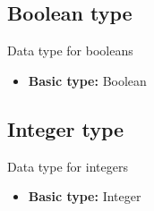\documentclass{article}
\begin{document}
\subsection{Boolean type}
Data type for booleans
\begin{itemize}
\item \textbf{Basic type:} Boolean
\end{itemize}
\subsection{Integer type}
Data type for integers
\begin{itemize}
\item \textbf{Basic type:} Integer
\end{itemize}
\end{document}
